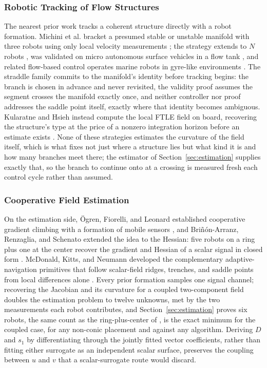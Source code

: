\documentclass[lettersize,journal]{IEEEtran}
\begin{document}
\subsubsection{Robotic Tracking of Flow Structures}
The nearest prior work tracks a coherent structure directly with a
robot formation. Michini et al. bracket a presumed stable or unstable
manifold with three robots using only local velocity measurements
\cite{9}; the strategy extends to $N$ robots \cite{10}, was validated
on micro autonomous surface vehicles in a flow tank \cite{11}, and
related flow-based control operates marine robots in gyre-like
environments \cite{12}. The straddle family commits to the manifold's
identity before tracking begins: the branch is chosen in advance and
never revisited, the validity proof assumes the segment crosses the
manifold exactly once, and neither controller nor proof addresses the
saddle point itself, exactly where that identity becomes ambiguous.
Kularatne and Hsieh instead compute the local FTLE field on board,
recovering the structure's type at the price of a nonzero integration
horizon before an estimate exists \cite{13}. None of these strategies
estimates the curvature of the field itself, which is what fixes not
just where a structure lies but what kind it is and how many branches
meet there; the estimator of Section~\ref{sec:estimation} supplies
exactly that, so the branch to continue onto at a crossing is measured
fresh each control cycle rather than assumed.

\subsubsection{Cooperative Field Estimation}
On the estimation side, \"{O}gren, Fiorelli, and Leonard established
cooperative gradient climbing with a formation of mobile sensors
\cite{26}, and Bri\~{n}\'{o}n-Arranz, Renzaglia, and Schenato extended
the idea to the Hessian: five robots on a ring plus one at the center
recover the gradient and Hessian of a scalar signal in closed form
\cite{15}. McDonald, Kitts, and Neumann developed the complementary
adaptive-navigation primitives that follow scalar-field ridges,
trenches, and saddle points from local differences alone
\cite{27,28,29}. Every prior formation samples one signal channel;
recovering the Jacobian and its curvature for a coupled two-component
field doubles the estimation problem to twelve unknowns, met by the two
measurements each robot contributes, and Section~\ref{sec:estimation}
proves six robots, the same count as the ring-plus-center of \cite{15},
is the exact minimum for the coupled case, for any non-conic placement
and against any algorithm. Deriving $D$ and $s_1$ by differentiating through the
jointly fitted vector coefficients, rather than fitting either
surrogate as an independent scalar surface, preserves the coupling
between $u$ and $v$ that a scalar-surrogate route would discard.
\end{document}
